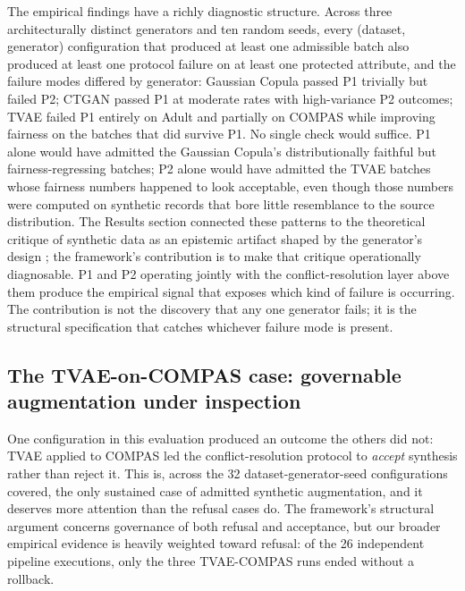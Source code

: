 \documentclass[11pt]{article}
\begin{document}
The empirical findings have a richly diagnostic structure. Across three architecturally distinct generators and ten random seeds, every (dataset, generator) configuration that produced at least one admissible batch also produced at least one protocol failure on at least one protected attribute, and the failure modes differed by generator: Gaussian Copula passed P1 trivially but failed P2; CTGAN passed P1 at moderate rates with high-variance P2 outcomes; TVAE failed P1 entirely on Adult and partially on COMPAS while improving fairness on the batches that did survive P1. No single check would suffice. P1 alone would have admitted the Gaussian Copula's distributionally faithful but fairness-regressing batches; P2 alone would have admitted the TVAE batches whose fairness numbers happened to look acceptable, even though those numbers were computed on synthetic records that bore little resemblance to the source distribution. The Results section connected these patterns to the theoretical critique of synthetic data as an epistemic artifact shaped by the generator's design \cite{Capasso2025,Kapania2025}; the framework's contribution is to make that critique operationally diagnosable. P1 and P2 operating jointly with the conflict-resolution layer above them produce the empirical signal that exposes which kind of failure is occurring. The contribution is not the discovery that any one generator fails; it is the structural specification that catches whichever failure mode is present.

\subsection{The TVAE-on-COMPAS case: governable augmentation under inspection}
\label{subsec:tvae_compas}

One configuration in this evaluation produced an outcome the others did not: TVAE applied to COMPAS led the conflict-resolution protocol to \emph{accept} synthesis rather than reject it. This is, across the 32 dataset-generator-seed configurations covered, the only sustained case of admitted synthetic augmentation, and it deserves more attention than the refusal cases do. The framework's structural argument concerns governance of both refusal and acceptance, but our broader empirical evidence is heavily weighted toward refusal: of the 26 independent pipeline executions, only the three TVAE-COMPAS runs ended without a rollback.
\end{document}
